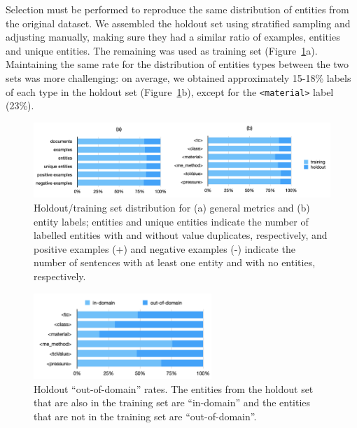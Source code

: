 Selection must be performed to reproduce the same distribution of entities from the original dataset.
We assembled the holdout set using stratified sampling and adjusting manually, making sure they had a similar ratio of examples, entities and unique entities. The remaining was used as training set (Figure~\ref{fig:training-holdout-set-distribution}a).
Maintaining the same rate for the distribution of entities types between the two sets was more challenging: on average, we obtained approximately 15-18\% labels of each type in the holdout set (Figure~\ref{fig:training-holdout-set-distribution}b), except for the \texttt{<material>} label (23\%). 

\begin{figure}[ht]
    \centering
    \includegraphics[width=\textwidth]{figures/automatic_extraction_supercon/superconductor-holdout-training-set}
    \caption{Holdout/training set distribution for (a) general metrics and (b) entity labels; entities and unique entities indicate the number of labelled entities with and without value duplicates, respectively, and positive examples (+) and negative examples (-) indicate the number of sentences with at least one entity and with no entities, respectively.}
    \label{fig:training-holdout-set-distribution}
\end{figure}

\begin{figure}[ht]
    \centering
    \includegraphics[width=0.6\textwidth]{figures/automatic_extraction_supercon/superconductor-out-domain-holdout-unique}
    \caption{Holdout ``out-of-domain'' rates. The entities from the holdout set that are also in the training set are ``in-domain'' and the entities that are not in the training set are ``out-of-domain''.}
    \label{fig:out-domain-holdout}
\end{figure}

